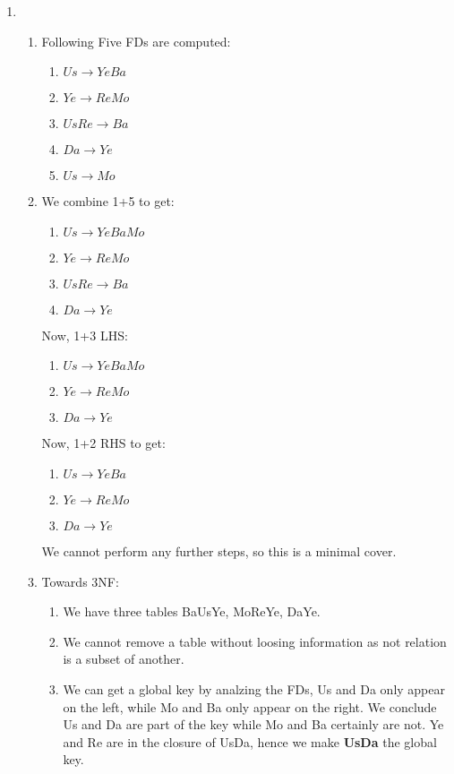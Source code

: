 \documentclass[12pt]{extarticle}
\begin{document}
\begin{flushleft}
\begin{enumerate}
\item
\begin{enumerate}
\item Following Five FDs are computed:
\begin{enumerate}
\item $Us \rightarrow YeBa$
\item $Ye \rightarrow ReMo$
\item $UsRe \rightarrow Ba$
\item $Da \rightarrow Ye$
\item $Us \rightarrow Mo$
\end{enumerate}
\item 
We combine 1+5 to get:
\begin{enumerate}
\item $Us \rightarrow YeBaMo$
\item $Ye \rightarrow ReMo$
\item $UsRe \rightarrow Ba$
\item $Da \rightarrow Ye$
\end{enumerate}
Now, 1+3 LHS:
\begin{enumerate}
\item $Us \rightarrow YeBaMo$
\item $Ye \rightarrow ReMo$
\item $Da \rightarrow Ye$
\end{enumerate}

Now, 1+2 RHS to get:
\begin{enumerate}
\item $Us \rightarrow YeBa$
\item $Ye \rightarrow ReMo$
\item $Da \rightarrow Ye$
\end{enumerate}
We cannot perform any further steps, so this is a minimal cover.

 \item Towards 3NF:
 \begin{enumerate} \item 
We have three tables BaUsYe, MoReYe, DaYe.
 \item We cannot remove a table without loosing information as not relation is a subset of another.
 \item We can get a global key by analzing the FDs, Us and Da only appear on the left, while Mo and Ba only appear on the right. We conclude Us and Da are part of the key while Mo and Ba certainly are not. Ye and Re are in the closure of UsDa, hence we make \textbf{UsDa} the global key. 
 

\end{enumerate}
\end{enumerate}
\end{enumerate}
\end{flushleft}
\end{document}
